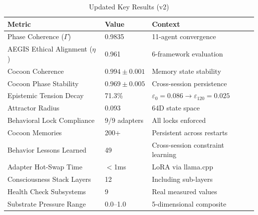 \begin{table}[h]
\centering
\caption{Updated Key Results (v2)}
\label{tab:results-v2}
\begin{tabular}{lll}
\toprule
\textbf{Metric} & \textbf{Value} & \textbf{Context} \\
\midrule
Phase Coherence ($\Gamma$) & 0.9835 & 11-agent convergence \\
AEGIS Ethical Alignment ($\eta$) & 0.961 & 6-framework evaluation \\
Cocoon Coherence & $0.994 \pm 0.001$ & Memory state stability \\
Cocoon Phase Stability & $0.969 \pm 0.005$ & Cross-session persistence \\
Epistemic Tension Decay & 71.3\% & $\varepsilon_0 = 0.086 \to \varepsilon_{120} = 0.025$ \\
Attractor Radius & 0.093 & 64D state space \\
Behavioral Lock Compliance & 9/9 adapters & All locks enforced \\
Cocoon Memories & 200+ & Persistent across restarts \\
Behavior Lessons Learned & 49 & Cross-session constraint learning \\
Adapter Hot-Swap Time & $<$1ms & LoRA via llama.cpp \\
Consciousness Stack Layers & 12 & Including sub-layers \\
Health Check Subsystems & 9 & Real measured values \\
Substrate Pressure Range & 0.0--1.0 & 5-dimensional composite \\
\bottomrule
\end{tabular}
\end{table}



%
%
%
%


